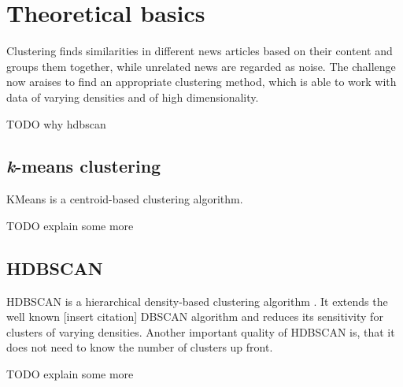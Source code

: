\section{Theoretical basics}

Clustering finds similarities in different news articles based on their content and groups them together, while unrelated news are regarded as noise. The challenge now araises to find an appropriate clustering method, which is able to work with data of varying densities and of high dimensionality.

TODO why hdbscan

\subsection{\textit{k}-means clustering}
KMeans is a centroid-based clustering algorithm.

TODO explain some more

\subsection{HDBSCAN}
HDBSCAN is a hierarchical density-based clustering algorithm \cite{McInnes2017}. It extends the well known [insert citation] DBSCAN algorithm and reduces its sensitivity for clusters of varying densities. Another important quality of HDBSCAN is, that it does not need to know the number of clusters up front.

TODO explain some more
